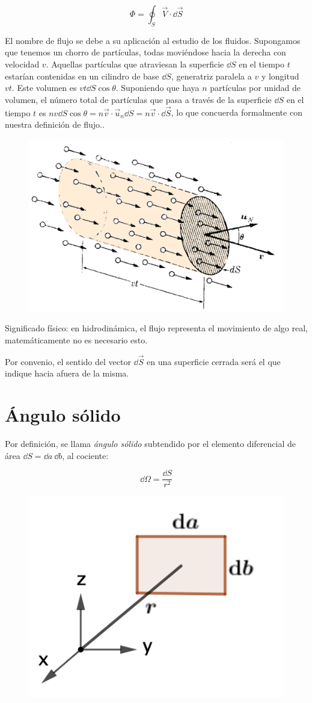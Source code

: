 \begin{equation}
	\Phi= \oint_S \vec V \cdot \dd \vec S 
\end{equation}


\begin{multicols}{2}
\small{El nombre de flujo se debe a su aplicación al estudio de los fluidos. Supongamos que tenemos un chorro de partículas, todas moviéndose hacia la derecha con velocidad $v$. Aquellas partículas que atraviesan la superficie $\dd S$ en el tiempo $t$ estarían contenidas en un cilindro de base $\dd S$, generatriz paralela a $v$ y longitud $vt$. Este volumen es $vt \dd S \cos \theta$. Suponiendo que haya $n$ partículas por unidad de volumen, el número total de partículas que pasa a través de la superficie $\dd S$ en el tiempo $t$ es $nv \dd S \cos \theta=n\vec v \cdot \vec u_n \dd S=n\vec v\cdot \dd \vec S$}, lo que concuerda formalmente con nuestra definición de flujo.\normalsize{.}
\begin{figure}[H]
	\centering
	\includegraphics[width=.5\textwidth]{imagenes/imagenes23/T23IM02.png}
\end{figure}	
\end{multicols}

Significado físico: en hidrodinámica, el flujo representa el movimiento de algo real, matemáticamente no es necesario esto.

Por convenio, el sentido del vector $\dd \vec S$ en una superficie cerrada será el que indique hacia afuera de la misma.

\section{Ángulo sólido}

\begin{multicols}{2}
Por definición, se llama \emph{ángulo sólido} subtendido por el elemento diferencial de área $\dd S=\dd a \ \dd b$, al cociente:

\begin{equation}
\boldsymbol \dd \Omega	= \dfrac {\dd S}{r^2}
\end{equation}

\begin{figure}[H]
	\centering
	\includegraphics[width=.3\textwidth]{imagenes/imagenes23/T23IM03.png}
\end{figure}
\end{multicols}

